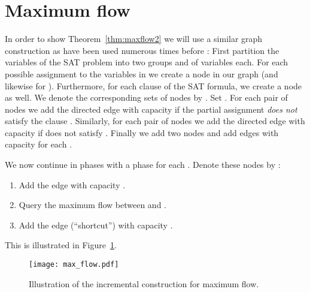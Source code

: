 \documentclass[a4paper,11pt]{article}
\theoremstyle{definition}
\begin{document}
\section{Maximum flow}
In order to show Theorem~\ref{thm:maxflow2} we will use a similar graph
construction as have been used numerous times before
\cite{PatrascuW10,RodittyW13,ChechikLRSTW14,AbboudV14}:
First partition the variables of the SAT problem into two
groups  and  of  variables each. For each possible assignment to the variables
in  we create a node in our graph  (and likewise for ). Furthermore,
for each clause of the SAT formula, we create a node as well. We denote the
corresponding sets of nodes by . Set . For
each pair of nodes  we add the directed edge  with
capacity  if the partial assignment  \emph{does not} satisfy the clause
. Similarly, for each pair of nodes  we add the directed
edge  with capacity  if  does not satisfy . Finally we add two
nodes  and add edges  with capacity  for each .

We now continue in phases with a phase for each . Denote these nodes
by :
\begin{enumerate}
    \item Add the edge  with capacity .
    \item Query the maximum flow between  and .
    \item Add the edge (``shortcut'')  with capacity .
\end{enumerate}
This is illustrated in Figure~\ref{fig:maxflow}.
\begin{figure}[htbp]
    \centering
    \texttt{[image: max\_flow.pdf]}
    \caption{Illustration of the incremental construction for maximum flow.}
    \label{fig:maxflow}
\end{figure}
\end{document}
